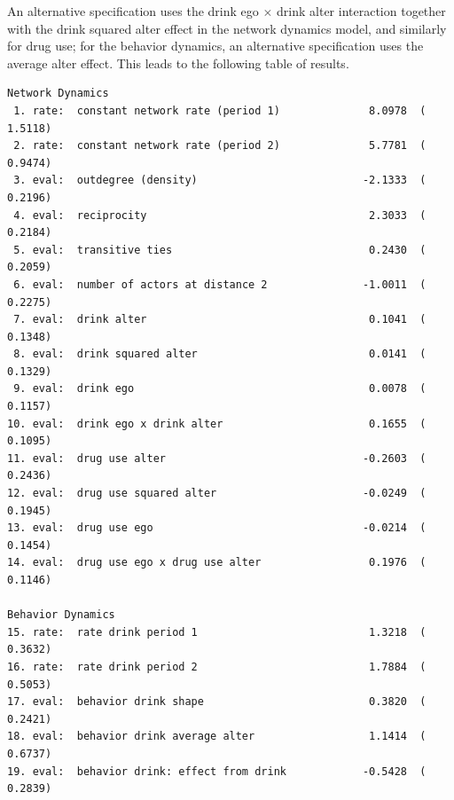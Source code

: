 \documentclass[a4paper,fleqn]{article}
\newcommand{\+}{\, + \,}
\begin{document}
{An alternative specification uses the drink ego $\times$ drink alter interaction
together with the drink squared alter effect in the network dynamics model,
and similarly for drug use; for the behavior dynamics,
an alternative specification uses the average alter effect.
This leads to the following table of results.

\begin{verbatim}
Network Dynamics
 1. rate:  constant network rate (period 1)              8.0978  (   1.5118)
 2. rate:  constant network rate (period 2)              5.7781  (   0.9474)
 3. eval:  outdegree (density)                          -2.1333  (   0.2196)
 4. eval:  reciprocity                                   2.3033  (   0.2184)
 5. eval:  transitive ties                               0.2430  (   0.2059)
 6. eval:  number of actors at distance 2               -1.0011  (   0.2275)
 7. eval:  drink alter                                   0.1041  (   0.1348)
 8. eval:  drink squared alter                           0.0141  (   0.1329)
 9. eval:  drink ego                                     0.0078  (   0.1157)
10. eval:  drink ego x drink alter                       0.1655  (   0.1095)
11. eval:  drug use alter                               -0.2603  (   0.2436)
12. eval:  drug use squared alter                       -0.0249  (   0.1945)
13. eval:  drug use ego                                 -0.0214  (   0.1454)
14. eval:  drug use ego x drug use alter                 0.1976  (   0.1146)

Behavior Dynamics
15. rate:  rate drink period 1                           1.3218  (   0.3632)
16. rate:  rate drink period 2                           1.7884  (   0.5053)
17. eval:  behavior drink shape                          0.3820  (   0.2421)
18. eval:  behavior drink average alter                  1.1414  (   0.6737)
19. eval:  behavior drink: effect from drink            -0.5428  (   0.2839)
\end{verbatim}

}
\end{document}
